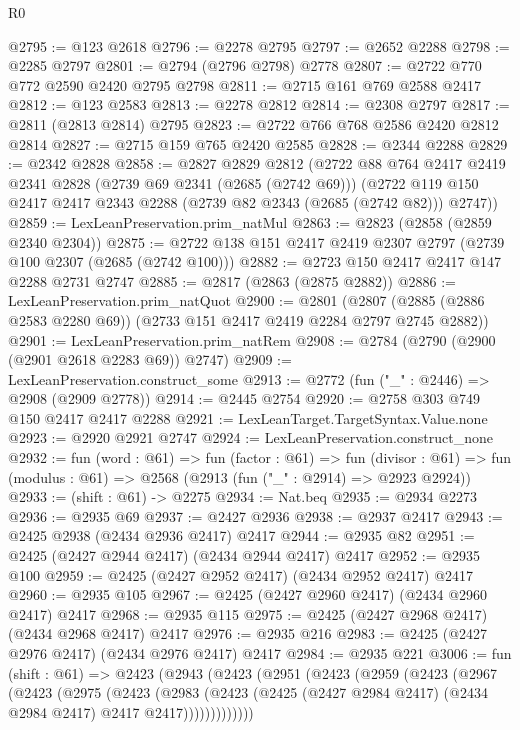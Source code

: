 \begin{lexlean}{R0}
\begin{coremodule}
@2795 := @123 @2618
@2796 := @2278 @2795
@2797 := @2652 @2288
@2798 := @2285 @2797
@2801 := @2794 (@2796 @2798) @2778
@2807 := @2722 @770 @772 @2590 @2420 @2795 @2798
@2811 := @2715 @161 @769 @2588 @2417
@2812 := @123 @2583
@2813 := @2278 @2812
@2814 := @2308 @2797
@2817 := @2811 (@2813 @2814) @2795
@2823 := @2722 @766 @768 @2586 @2420 @2812 @2814
@2827 := @2715 @159 @765 @2420 @2585
@2828 := @2344 @2288
@2829 := @2342 @2828
@2858 := @2827
    @2829
    @2812
    (@2722
      @88
      @764
      @2417
      @2419
      @2341
      @2828
      (@2739 @69 @2341 (@2685 (@2742 @69)))
      (@2722 @119 @150 @2417 @2417 @2343 @2288 (@2739 @82 @2343 (@2685 (@2742 @82))) @2747))
@2859 := LexLeanPreservation.prim_natMul
@2863 := @2823 (@2858 (@2859 @2340 @2304))
@2875 := @2722 @138 @151 @2417 @2419 @2307 @2797 (@2739 @100 @2307 (@2685 (@2742 @100)))
@2882 := @2723 @150 @2417 @2417 @147 @2288 @2731 @2747
@2885 := @2817 (@2863 (@2875 @2882))
@2886 := LexLeanPreservation.prim_natQuot
@2900 := @2801
    (@2807 (@2885 (@2886 @2583 @2280 @69)) (@2733 @151 @2417 @2419 @2284 @2797 @2745 @2882))
@2901 := LexLeanPreservation.prim_natRem
@2908 := @2784 (@2790 (@2900 (@2901 @2618 @2283 @69)) @2747)
@2909 := LexLeanPreservation.construct_some
@2913 := @2772 (fun ("_" : @2446) => @2908 (@2909 @2778))
@2914 := @2445 @2754
@2920 := @2758 @303 @749 @150 @2417 @2417 @2288
@2921 := LexLeanTarget.TargetSyntax.Value.none
@2923 := @2920 @2921 @2747
@2924 := LexLeanPreservation.construct_none
@2932 := fun (word : @61) =>
  fun (factor : @61) =>
  fun (divisor : @61) => fun (modulus : @61) => @2568 (@2913 (fun ("_" : @2914) => @2923 @2924))
@2933 := (shift : @61) -> @2275
@2934 := Nat.beq
@2935 := @2934 @2273
@2936 := @2935 @69
@2937 := @2427 @2936
@2938 := @2937 @2417
@2943 := @2425 @2938 (@2434 @2936 @2417) @2417
@2944 := @2935 @82
@2951 := @2425 (@2427 @2944 @2417) (@2434 @2944 @2417) @2417
@2952 := @2935 @100
@2959 := @2425 (@2427 @2952 @2417) (@2434 @2952 @2417) @2417
@2960 := @2935 @105
@2967 := @2425 (@2427 @2960 @2417) (@2434 @2960 @2417) @2417
@2968 := @2935 @115
@2975 := @2425 (@2427 @2968 @2417) (@2434 @2968 @2417) @2417
@2976 := @2935 @216
@2983 := @2425 (@2427 @2976 @2417) (@2434 @2976 @2417) @2417
@2984 := @2935 @221
@3006 := fun (shift : @61) =>
  @2423
    (@2943
      (@2423
        (@2951
          (@2423
            (@2959
              (@2423
                (@2967
                  (@2423
                    (@2975
                      (@2423
                        (@2983
                          (@2423
                            (@2425 (@2427 @2984 @2417) (@2434 @2984 @2417) @2417 @2417)))))))))))))

\end{coremodule}
\end{lexlean}
